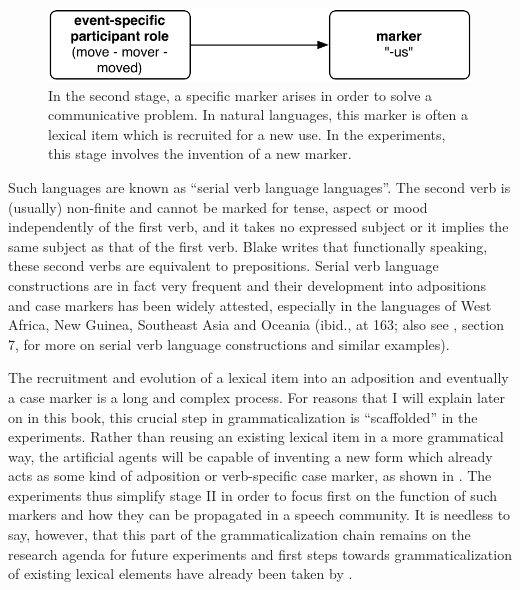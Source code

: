 \begin{figure}[b]
\centerline{\includegraphics[scale=0.6]{chap-introduction/figs/stage2}}
  \caption[Formation of case markers: stage II]{In the second stage, a specific marker arises in order to solve a communicative problem. In natural languages, this marker is often a lexical item which is recruited for a new use. In the experiments, this stage involves the invention of a new marker.}
   \label{f:stage2}
\end{figure}

Such languages are known as ``serial verb language languages''. The second verb is (usually) non-finite and cannot be marked for tense, aspect or mood independently of the first verb, and it takes no expressed subject or it implies the same subject as that of the first verb. Blake writes that functionally speaking, these second verbs are equivalent to prepositions. Serial verb language constructions are in fact very frequent and their development into adpositions and case markers has been widely attested, especially in the languages of West Africa, New Guinea, Southeast Asia and Oceania (ibid., at 163; also see \citealp{givon97introduction}, section 7, for more on serial verb language constructions and similar examples).

The recruitment and evolution of a lexical item into an adposition and eventually a case marker is a long and complex process. For reasons that I will explain later on in this book, this crucial step in grammaticalization is ``scaffolded'' in the experiments. Rather than reusing an existing lexical item in a more grammatical way, the artificial agents will be capable of inventing a new form which already acts as some kind of adposition or verb-specific case marker, as shown in . The experiments thus simplify stage II in order to focus first on the function of such markers and how they can be propagated in a speech community. It is needless to say, however, that this part of the grammaticalization chain remains on the research agenda for future experiments and first steps towards grammaticalization of existing lexical elements have already been taken by \citet{wellens08flexible}.

